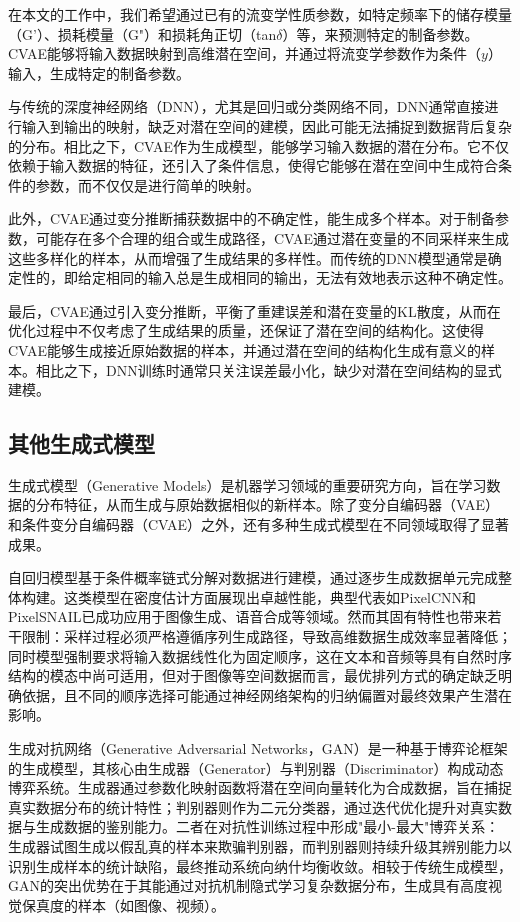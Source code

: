 在本文的工作中，我们希望通过已有的流变学性质参数，如特定频率下的储存模量（G'）、损耗模量（G"）和损耗角正切（tan$\delta$）等，来预测特定的制备参数。CVAE能够将输入数据映射到高维潜在空间，并通过将流变学参数作为条件（$y$）输入，生成特定的制备参数。

与传统的深度神经网络（DNN），尤其是回归或分类网络不同，DNN通常直接进行输入到输出的映射，缺乏对潜在空间的建模，因此可能无法捕捉到数据背后复杂的分布。相比之下，CVAE作为生成模型，能够学习输入数据的潜在分布。它不仅依赖于输入数据的特征，还引入了条件信息，使得它能够在潜在空间中生成符合条件的参数，而不仅仅是进行简单的映射。

此外，CVAE通过变分推断捕获数据中的不确定性，能生成多个样本。对于制备参数，可能存在多个合理的组合或生成路径，CVAE通过潜在变量的不同采样来生成这些多样化的样本，从而增强了生成结果的多样性。而传统的DNN模型通常是确定性的，即给定相同的输入总是生成相同的输出，无法有效地表示这种不确定性。

最后，CVAE通过引入变分推断，平衡了重建误差和潜在变量的KL散度，从而在优化过程中不仅考虑了生成结果的质量，还保证了潜在空间的结构化。这使得CVAE能够生成接近原始数据的样本，并通过潜在空间的结构化生成有意义的样本。相比之下，DNN训练时通常只关注误差最小化，缺少对潜在空间结构的显式建模。
\subsection{其他生成式模型}
生成式模型（Generative Models）是机器学习领域的重要研究方向，旨在学习数据的分布特征，从而生成与原始数据相似的新样本。除了变分自编码器（VAE）和条件变分自编码器（CVAE）之外，还有多种生成式模型在不同领域取得了显著成果。

自回归模型基于条件概率链式分解对数据进行建模，通过逐步生成数据单元完成整体构建\cite{bengio2003adaptive}。这类模型在密度估计方面展现出卓越性能，典型代表如PixelCNN和PixelSNAIL已成功应用于图像生成、语音合成等领域。然而其固有特性也带来若干限制：采样过程必须严格遵循序列生成路径，导致高维数据生成效率显著降低；同时模型强制要求将输入数据线性化为固定顺序，这在文本和音频等具有自然时序结构的模态中尚可适用，但对于图像等空间数据而言，最优排列方式的确定缺乏明确依据，且不同的顺序选择可能通过神经网络架构的归纳偏置对最终效果产生潜在影响\cite{bondtaylor2022deep}。

生成对抗网络（Generative Adversarial Networks，GAN）是一种基于博弈论框架的生成模型，其核心由生成器（Generator）与判别器（Discriminator）构成动态博弈系统\cite{NIPS2014_5ca3e9b1}。生成器通过参数化映射函数将潜在空间向量转化为合成数据，旨在捕捉真实数据分布的统计特性；判别器则作为二元分类器，通过迭代优化提升对真实数据与生成数据的鉴别能力。二者在对抗性训练过程中形成"最小-最大"博弈关系：生成器试图生成以假乱真的样本来欺骗判别器，而判别器则持续升级其辨别能力以识别生成样本的统计缺陷，最终推动系统向纳什均衡收敛。相较于传统生成模型，GAN的突出优势在于其能通过对抗机制隐式学习复杂数据分布，生成具有高度视觉保真度的样本（如图像、视频）\cite{Goodfellow2020Generative}。

